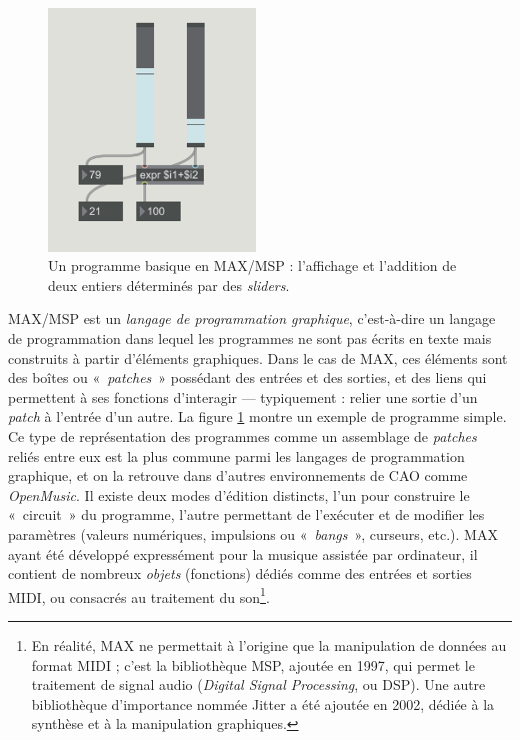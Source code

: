 \documentclass[a4paper,12pt]{article}
\newcommand{\guill}[1]{«~#1~»}
\begin{document}
\begin{figure}[!h]
\centering
\includegraphics[width=5.5cm]{images/MAXbase.png}
\caption{\footnotesize Un programme basique en MAX/MSP : l'affichage et l'addition de deux entiers déterminés par des \emph{sliders}.}
\label{maxmsp}
\end{figure}

MAX/MSP est un \emph{langage de programmation graphique}, c'est-à-dire un langage de programmation dans lequel les programmes ne sont pas écrits en texte mais construits à partir d'éléments graphiques. Dans le cas de MAX, ces éléments sont des boîtes ou \guill{\emph{patches}} possédant des entrées et des sorties, et des liens qui permettent à ses fonctions d'interagir --- typiquement : relier une sortie d'un \emph{patch} à l'entrée d'un autre. La figure \ref{maxmsp} montre un exemple de programme simple. Ce type de représentation des programmes comme un assemblage de \emph{patches} reliés entre eux est la plus commune parmi les langages de programmation graphique, et on la retrouve dans d'autres environnements de CAO comme \emph{OpenMusic}. Il existe deux modes d'édition distincts, l'un pour construire le \guill{circuit} du programme, l'autre permettant de l'exécuter et de modifier les paramètres (valeurs numériques, impulsions ou \guill{\emph{bangs}}, curseurs, etc.). MAX ayant été développé expressément pour la musique assistée par ordinateur, il contient de nombreux \emph{objets} (fonctions) dédiés comme des entrées et sorties MIDI, ou consacrés au traitement du son\footnote{En réalité, MAX ne permettait à l'origine que la manipulation de données au format MIDI ; c'est la bibliothèque MSP, ajoutée en 1997, qui permet le traitement de signal audio (\emph{Digital Signal Processing}, ou DSP). Une autre bibliothèque d'importance nommée Jitter a été ajoutée en 2002, dédiée à la synthèse et à la manipulation graphiques.}.
\end{document}
